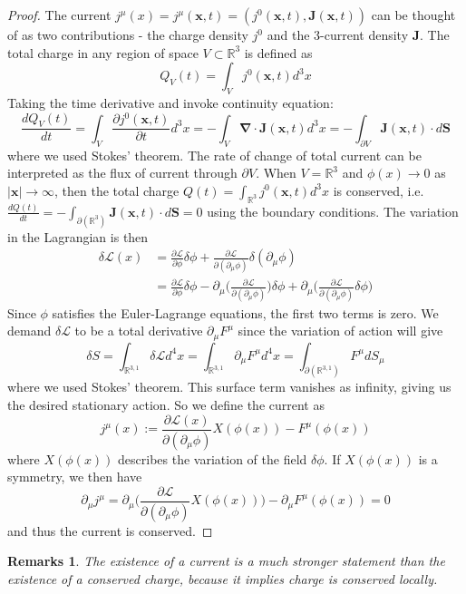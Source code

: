 \documentclass[a4paper]{article}
\newtheorem{remarks}{Remarks}[section]
\theoremstyle{new}
\begin{document}
\begin{proof}
The current $j^\mu(x)=j^\mu(\mathbf{x},t)=(j^0(\mathbf{x},t),\mathbf{J}(\mathbf{x},t))$ can be thought of as two contributions - the charge density $j^0$ and the 3-current density $\mathbf{J}$. The total charge in any region of space $V\subset\mathbb{R}^3$ is defined as
$$Q_V(t)=\int_Vj^0(\mathbf{x},t)d^3x$$
Taking the time derivative and invoke continuity equation:
$$\frac{dQ_V(t)}{dt}=\int_V\frac{\partial j^0(\mathbf{x},t)}{\partial t}d^3x=-\int_V\boldsymbol{\nabla}\cdot\mathbf{J}(\mathbf{x},t)d^3x=-\int_{\partial V}\mathbf{J}(\mathbf{x},t)\cdot d\mathbf{S}$$
where we used Stokes' theorem. The rate of change of total current can be interpreted as the flux of current through $\partial V$. When $V=\mathbb{R}^3$ and $\phi(x)\rightarrow 0$ as $|\mathbf{x}|\rightarrow\infty$, then the total charge $Q(t)=\int_{\mathbb{R}^3}j^0(\mathbf{x},t)d^3x$ is conserved, i.e. $\frac{dQ(t)}{dt}=-\int_{\partial(\mathbb{R}^3)}\mathbf{J}(\mathbf{x},t)\cdot d\mathbf{S}=0$ using the boundary conditions. The variation in the Lagrangian is then
\begin{align}
\delta\mathcal{L}(x)&=\frac{\partial\mathcal{L}}{\partial\phi}\delta\phi+\frac{\partial\mathcal{L}}{\partial(\partial_\mu\phi)}\delta(\partial_\mu\phi)\nonumber\\&=\frac{\partial\mathcal{L}}{\partial\phi}\delta\phi-\partial_\mu\bigg(\frac{\partial\mathcal{L}}{\partial(\partial_\mu\phi)}\bigg)\delta\phi+\partial_\mu\bigg(\frac{\partial\mathcal{L}}{\partial(\partial_\mu\phi)}\delta\phi\bigg)\nonumber
\end{align}
Since $\phi$ satisfies the Euler-Lagrange equations, the first two terms is zero. We demand $\delta\mathcal{L}$ to be a total derivative $\partial_\mu F^\mu$ since the variation of action will give
$$\delta S=\int_{\mathbb{R}^{3,1}}\delta\mathcal{L}d^4x=\int_{\mathbb{R}^{3,1}}\partial_\mu F^\mu d^4x=\int_{\partial(\mathbb{R}^{3,1})}F^\mu dS_\mu$$
where we used Stokes' theorem. This surface term vanishes as infinity, giving us the desired stationary action. So we define the current as
$$j^\mu(x):=\frac{\partial\mathcal{L}(x)}{\partial(\partial_\mu\phi)}X(\phi(x))-F^\mu(\phi(x))$$
where $X(\phi(x))$ describes the variation of the field $\delta\phi$. If $X(\phi(x))$ is a symmetry, we then have
$$\partial_\mu j^\mu=\partial_\mu\bigg(\frac{\partial\mathcal{L}}{\partial(\partial_\mu\phi)}X(\phi(x))\bigg)-\partial_\mu F^\mu(\phi(x))=0$$
and thus the current is conserved.
\end{proof}
\begin{remarks}
The existence of a current is a much stronger statement than the existence of a conserved charge, because it implies charge is conserved locally.
\end{remarks}
\end{document}
